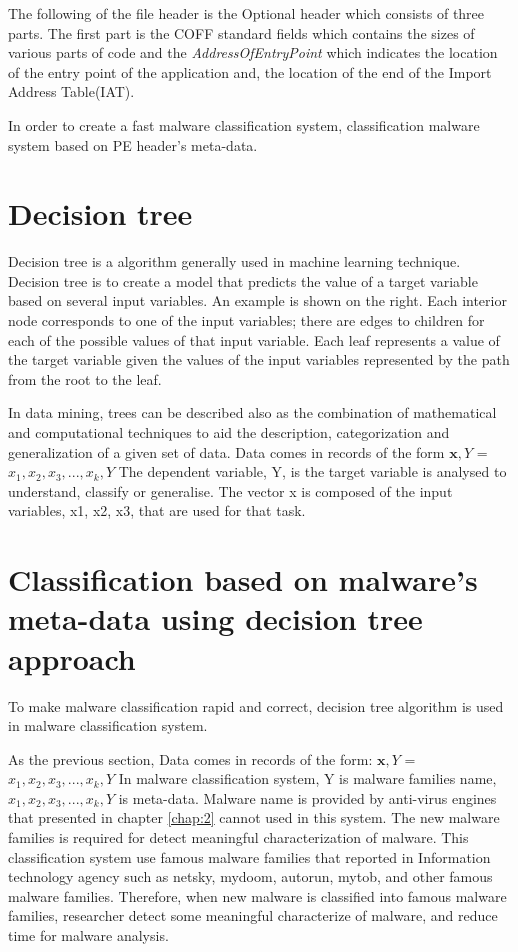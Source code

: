 The following of the file header is the Optional header which consists of three parts. The first part is the COFF standard fields which contains the sizes of various parts of code and the \emph{AddressOfEntryPoint} which indicates the location of the entry point of the application and, the location of the end of the Import Address Table(IAT).

In order to create a fast malware classification system, classification malware system based on PE header's meta-data.

\section{Decision tree\cite{wikipedia}}
Decision tree is a algorithm generally used in machine learning technique. Decision tree is to create a model that predicts the value of a target variable based on several input variables. An example is shown on the right. Each interior node corresponds to one of the input variables; there are edges to children for each of the possible values of that input variable. Each leaf represents a value of the target variable given the values of the input variables represented by the path from the root to the leaf.

In data mining, trees can be described also as the combination of mathematical and computational techniques to aid the description, categorization and generalization of a given set of data.
Data comes in records of the form
\(\textbf{x},Y\) = \(x_1, x_2, x_3, ..., x_k, Y\)
The dependent variable, Y, is the target variable is analysed to understand, classify or generalise. The vector x is composed of the input variables, x1, x2, x3, that are used for that task.
\section{Classification based on malware's meta-data using decision tree approach}
To make malware classification rapid and correct, decision tree algorithm is used in malware classification system.

As the previous section, Data comes in records of the form:
\(\textbf{x},Y\) = \(x_1, x_2, x_3, ..., x_k, Y\)
In malware classification system, Y is malware families name, \(x_1, x_2, x_3, ..., x_k, Y\) is meta-data. Malware name is provided by anti-virus engines that presented in chapter \ref{chap:2} cannot used in this system. The new malware families is required for detect meaningful characterization of malware. This classification system use famous malware families that reported in Information technology agency such as netsky, mydoom, autorun, mytob, and other famous malware families. Therefore, when new malware is classified into famous malware families, researcher detect some meaningful characterize of malware, and reduce time for malware analysis. 

